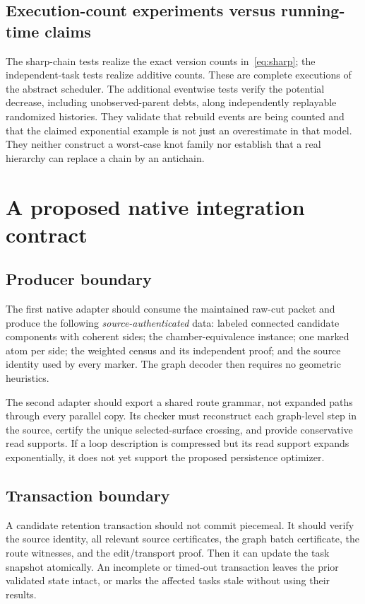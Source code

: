 \documentclass[11pt]{article}
\theoremstyle{definition}
\begin{document}
\subsection{Execution-count experiments versus running-time claims}
The sharp-chain tests realize the exact version counts in~\eqref{eq:sharp}; the independent-task tests realize additive counts. These are complete executions of the abstract scheduler. The additional eventwise tests verify the potential decrease, including unobserved-parent debts, along independently replayable randomized histories. They validate that rebuild events are being counted and that the claimed exponential example is not just an overestimate in that model. They neither construct a worst-case knot family nor establish that a real hierarchy can replace a chain by an antichain.

\section{A proposed native integration contract}\label{sec:integration}
\subsection{Producer boundary}
The first native adapter should consume the maintained raw-cut packet and produce the following \emph{source-authenticated} data: labeled connected candidate components with coherent sides; the chamber-equivalence instance; one marked atom per side; the weighted census and its independent proof; and the source identity used by every marker. The graph decoder then requires no geometric heuristics.

The second adapter should export a shared route grammar, not expanded paths through every parallel copy. Its checker must reconstruct each graph-level step in the source, certify the unique selected-surface crossing, and provide conservative read supports. If a loop description is compressed but its read support expands exponentially, it does not yet support the proposed persistence optimizer.

\subsection{Transaction boundary}
A candidate retention transaction should not commit piecemeal. It should verify the source identity, all relevant source certificates, the graph batch certificate, the route witnesses, and the edit/transport proof. Then it can update the task snapshot atomically. An incomplete or timed-out transaction leaves the prior validated state intact, or marks the affected tasks stale without using their results.
\end{document}
